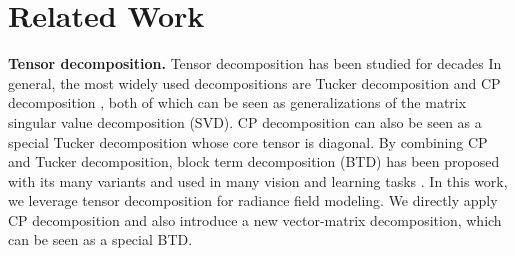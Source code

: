 \documentclass[runningheads]{llncs}
\newcommand{\boldstart}[1]{\noindent\textbf{#1}}
\begin{document}
%
 


\section{Related Work}
\boldstart{Tensor decomposition.} 
Tensor decomposition \cite{kolda2009tensor} has been studied for decades 
In general, the most widely used decompositions are Tucker decomposition \cite{tucker1966some} and CP decomposition \cite{carroll1970analysis,harshman1970foundations}, both of which can be seen as generalizations of the matrix singular value decomposition (SVD). CP decomposition can also be seen as a special Tucker decomposition whose core tensor is diagonal.
By combining CP and Tucker decomposition, block term decomposition (BTD) has been proposed with its many variants \cite{de2008decompositions} and 
used in many vision and learning tasks \cite{ben2019block,ye2018learning,ye2020block}.
In this work, we leverage tensor decomposition for radiance field modeling. 
We directly apply CP decomposition and also introduce a new vector-matrix decomposition, which can be seen as a special BTD. 
\end{document}
